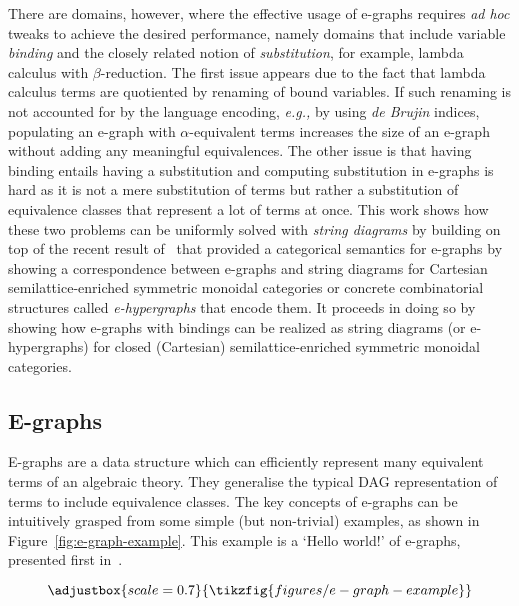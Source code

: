 \documentclass[peerreviewcls]{IEEEtran}
\begin{document}
There are domains, however, where the effective usage of e-graphs requires \textit{ad hoc} tweaks to achieve the desired performance, namely domains that include variable \textit{binding} and the closely related notion of \textit{substitution}, for example, lambda calculus with $\beta$-reduction.
The first issue appears due to the fact that lambda calculus terms are quotiented by renaming of bound variables.
If such renaming is not accounted for by the language encoding, \textit{e.g.,} by using \textit{de Brujin} indices, populating an e-graph with $\alpha$-equivalent terms increases the size of an e-graph without adding any meaningful equivalences.
The other issue is that having binding entails having a substitution and computing substitution in e-graphs is hard as it is not a mere substitution of terms but rather a substitution of equivalence classes that represent a lot of terms at once.
This work shows how these two problems can be uniformly solved with \textit{string diagrams} by building on top of the recent result of~\cite{ghica2024equivalencehypergraphsegraphsmonoidal} that provided a categorical semantics for e-graphs by showing a correspondence between e-graphs and string diagrams for Cartesian semilattice-enriched symmetric monoidal categories or concrete combinatorial structures called \textit{e-hypergraphs} that encode them.
It proceeds in doing so by showing how e-graphs with bindings can be realized as string diagrams (or e-hypergraphs) for closed (Cartesian) semilattice-enriched symmetric monoidal categories.

\subsection{E-graphs}

E-graphs are a data structure which can efficiently represent many equivalent terms of an algebraic theory.  They generalise the typical DAG representation of terms to include equivalence classes.
The key concepts of e-graphs can be intuitively grasped from some simple (but non-trivial) examples, as shown in Figure~\ref{fig:e-graph-example}.
This example is a `Hello world!' of e-graphs, presented first in~\cite{EggPaper}.

\begin{figure*}
\[
\adjustbox{scale=0.7}{
\tikzfig{figures/e-graph-example}
}
\]
\caption{E-graph example (top) and its equivalent string diagram representation (bottom)}
\label{fig:e-graph-example}
\end{figure*}
\end{document}
